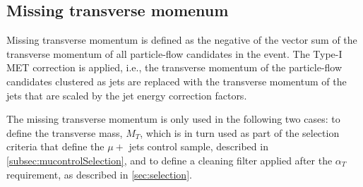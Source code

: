 \subsection{Missing transverse momenum}
Missing transverse momentum is defined as the negative of the vector sum
of the transverse momentum of all particle-flow candidates in the event.
The Type-I MET correction is applied, i.e., the transverse momentum of
the particle-flow candidates clustered as jets are replaced with the
transverse momentum of the jets that are scaled by the jet energy
correction factors.

The missing transverse momentum is only used in the following two cases:
to define the transverse mass, $M_{T}$, which is in turn used as part of
the selection criteria that define the $\mu +$ jets control sample,
described in \ref{subsec:mucontrolSelection}, and to define a cleaning filter applied after the
$\alpha_{T}$ requirement, as described in \ref{sec:selection}.



